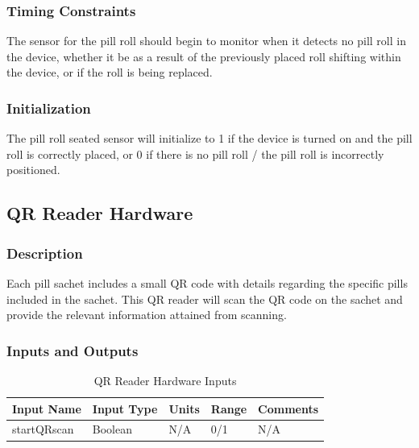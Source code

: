 \documentclass[12pt,titlepage]{article}
\begin{document}
\subsubsection*{Timing Constraints}
The sensor for the pill roll should begin to monitor when it detects no pill roll in the device, whether it be as a result of the previously placed roll shifting within the device, or if the roll is being replaced. 
\subsubsection*{Initialization}
The pill roll seated sensor will initialize to 1 if the device is turned on and the pill roll is correctly placed, or 0 if there is no pill roll / the pill roll is incorrectly positioned.
\subsection{QR Reader Hardware}
\subsubsection*{Description}
Each pill sachet includes a small QR code with details regarding the specific pills included in the sachet. This QR reader will scan the QR code on the sachet and provide the relevant information attained from scanning.
\subsubsection*{Inputs and Outputs}

\begin{table}[ht!]
\begin{center}
\begin{adjustbox}{max width=\textwidth}
\small
\begin{tabular}{|p{}|p{}|p{}|p{}|p{}|}
 \hline
 \textbf{Input Name} & \textbf{Input Type} & \textbf{Units} &\textbf{Range} & \textbf{Comments} \\
 \hline 
 startQRscan & Boolean & N/A & 0/1 & N/A \\
 \hline
\end{tabular}
\end{adjustbox}
\end{center}
\caption{QR Reader Hardware Inputs}
\end{table}
\end{document}
